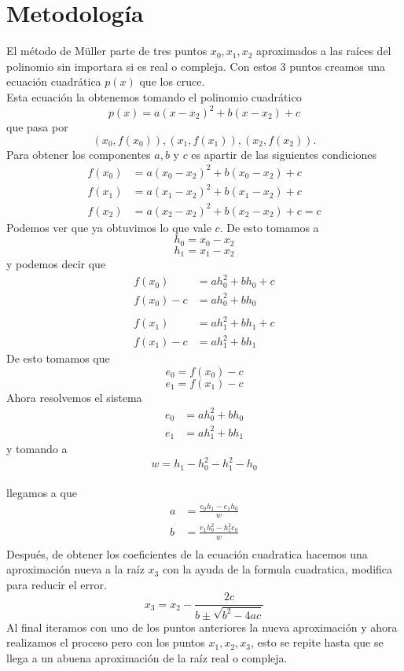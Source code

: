 \documentclass[12pt]{article}
\begin{document}
		\section*{\centering Metodología}\label{sec:Metodologia}
			El método de Müller parte de tres puntos $ x_0, x_1, x_2 $ aproximados a las raíces del polinomio 
			sin importara si es real o compleja. Con estos 3 puntos creamos una ecuación cuadrática $ p(x) $ 
			que los cruce.\\
			Esta ecuación la obtenemos tomando el polinomio cuadrático $$ p(x) = a(x-x_2)^2 + b(x-x_2) + c $$
			que pasa por $$ (x_0,f(x_0)), (x_1,f(x_1)),(x_2,f(x_2)). $$ Para obtener los componentes $ a, b $ y $ c $
			es apartir de las siguientes condiciones
			\begin{align*}
				f(x_0) &= a(x_0-x_2)^2 + b(x_0-x_2) + c \\
				f(x_1) &= a(x_1-x_2)^2 + b(x_1-x_2) + c \\
				f(x_2) &= a(x_2-x_2)^2 + b(x_2-x_2) + c = c
			\end{align*}
			Podemos ver que ya obtuvimos lo que vale $ c $. De esto tomamos a
			$$ h_0 = x_0-x_2 $$
			$$ h_1 = x_1-x_2 $$
			y podemos decir que
			\begin{align*}
				f(x_0) &= ah_0^2 + bh_0 + c \\
				f(x_0) - c &= ah_0^2 + bh_0 \\\\
				f(x_1) &= ah_1^2 + bh_1 + c\\
				f(x_1) - c &= ah_1^2 + bh_1 
			\end{align*}
			De esto tomamos que
			$$ e_0 = f(x_0)-c $$
			$$ e_1 = f(x_1)-c $$
			Ahora resolvemos el sistema
			\begin{align*}
				e_0 &= ah_0^2 + bh_0 \\
				e_1 &= ah_1^2 + bh_1 
			\end{align*}
			y tomando a $$ w = h_1-h_0^2 - h_1^2-h_0 $$ \\
			llegamos a que
			\begin{align*}
				a &= \frac{e_0h_1 - e_1h_0}{w} \\
				b &= \frac{e_1h_0^2 - h_1^2e_0}{w} \\
			\end{align*}
			Después, de obtener los coeficientes de la ecuación cuadratica hacemos una aproximación nueva 
			a la raíz $ x_3 $ con la ayuda de la formula cuadratica, modifica para reducir el error.
			$$ x_3 = x_2 - \frac{2c}{b\pm\sqrt{b^2-4ac}} $$
			Al final iteramos con uno de los puntos anteriores la nueva aproximación y ahora realizamos el 
			proceso pero con los puntos $ x_1, x_2, x_3 $, esto se repite hasta que se llega a un abuena 
			aproximación de la raíz real o compleja.
\end{document}

